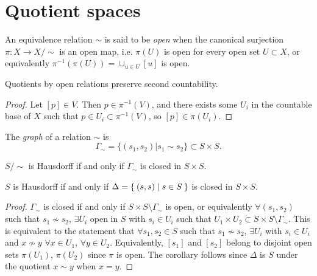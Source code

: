\section{Quotient spaces}

\begin{defn}
An equivalence relation $\sim$ is said to be \emph{open} when the
canonical surjection $\pi: X \to X / \sim$ is an open map, i.e.
$\pi(U)$ is open for every open set $U \subset X$, or equivalently
$\pi^{-1}(\pi(U)) = \cup_{u \in U} [u]$ is open.
\end{defn}

\begin{prop}
  Quotients by open relations preserve second countability.
\end{prop}

\begin{proof}
Let $[p] \in V$. Then $p \in \pi^{-1}(V)$, and there exists some
$U_i$ in the countable base of
$X$ such that $p \in U_i \subset \pi^{-1}(V)$, so $[p] \in \pi(U_i)$.
\end{proof}

\begin{defn}
The \emph{graph} of a relation $\sim$ is
$$
  \Gamma_\sim
= \{ (s_1, s_2) \vert s_1 \sim s_2 \}
\subset S \times S.
$$
\end{defn}

\begin{prop}
$S / \sim$ is Hausdorff if and only if $\Gamma_\sim$ is closed in
$S \times S$.
\end{prop}
\begin{corol}
$S$ is Hausdorff if and only if
$\Delta = \Set{(s, s) | s \in S}$ is closed in $S \times S$.
\end{corol}

\begin{proof}
$\Gamma_\sim$ is closed if and only if
$S \times S \setminus \Gamma_\sim$ is open, or equivalently
$\forall (s_1, s_2)$ such that $s_1 \nsim s_2$, $\exists U_i$ open in
$S$ with $s_i \in U_i$ such that
$U_1 \times U_2 \subset S \times S \setminus \Gamma_\sim$. This is
equivalent to the statement that $\forall s_1, s_2 \in S$ such that
$s_1 \nsim s_2$, $\exists U_i$ with $s_i \in U_i$ and
$x \nsim y$ $\forall x \in U_1$, $\forall y \in U_2$. Equivalently,
$[s_1]$ and $[s_2]$ belong to disjoint open sets $\pi(U_1)$,
$\pi(U_2)$ since $\pi$ is open. The corollary follows since
$\Delta$ is $S$ under the quotient $x \sim y$ when $x = y$.
\end{proof}

